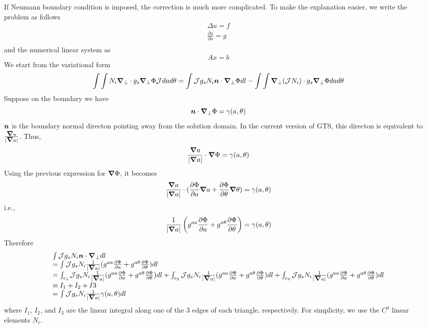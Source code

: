 \documentclass{report}
\newcommand{\bm}[1]{\mbox{\boldmath $#1$}}
\newcommand{\ff}[2]{\frac{#1}{#2}}
\newcommand{\pp}[2]{\frac{\partial{#1}}{\partial{#2}}}
\begin{document}
\noindent
If Neumann boundary condition is imposed, the correction is much more complicated.
To make the explanation easier, we write the problem as follows
$$
\begin{array}{l}
\Delta u = f \\
\pp{u}{n} = g \\
\end{array}
$$
and the numerical linear system as
$$A x = b $$
We start from the variational form 
$$
\int\int N_i \bm{\nabla}_\perp \cdot g_s \bm{\nabla}_\perp \Phi {\cal J} dad\theta
=
\int {\cal J} g_s N_i \bm{n} \cdot \bm{\nabla}_\perp \Phi dl
- \int\int \bm{\nabla}_\perp({\cal J} N_i) \cdot g_s \bm{\nabla}_\perp \Phi dad\theta
$$
Suppose on the boundary we have
$$
\bm{n} \cdot \bm{\nabla}_\perp \Phi = \gamma(a,\theta)
$$
$ \bm{n} $ is the boundary normal directon pointing away from the solution domain.
In the current version of GTS, this directon is equivalent to $\ff{\bm{\nabla}a}{|\bm{\nabla}a|}$.
Thus,
$$
\ff{\bm{\nabla}a}{|\bm{\nabla}a|} \cdot \bm{\nabla} \Phi = \gamma(a,\theta)
$$
Using the previous expression for $\bm{\nabla} \Phi$, it becomes
$$
\ff{\bm{\nabla}a}{|\bm{\nabla}a|} \cdot 
(\pp{\Phi}{a} \bm{\nabla}a + \pp{\Phi}{\theta} \bm{\nabla}\theta) 
= \gamma(a,\theta)
$$
i.e.,
$$
\ff{1}{|\bm{\nabla}a|} \left( g^{aa} \pp{\Phi}{a} + g^{a\theta}\pp{\Phi}{\theta} \right) = \gamma(a,\theta)
$$
Therefore
$$
\begin{array}{l}
\int {\cal J} g_s N_i \bm{n} \cdot \bm{\nabla}_\perp dl \\
= \int {\cal J} g_sN_i \ff{1}{|\bm{\nabla}a|} ( g^{aa} \pp{\Phi}{a} + g^{a\theta}\pp{\Phi}{\theta} ) dl \\
= \int_{e_1} {\cal J} g_s N_i \ff{1}{|\bm{\nabla}a|} ( g^{aa} \pp{\Phi}{a} + g^{a\theta}\pp{\Phi}{\theta} ) dl
  +
  \int_{e_2} {\cal J} g_s N_i \ff{1}{|\bm{\nabla}a|} ( g^{aa} \pp{\Phi}{a} + g^{a\theta}\pp{\Phi}{\theta} ) dl
  +
  \int_{e_3} {\cal J} g_s N_i \ff{1}{|\bm{\nabla}a|} ( g^{aa} \pp{\Phi}{a} + g^{a\theta}\pp{\Phi}{\theta} ) dl
\\
 \equiv I_1 + I_2 + I3 \\
= \int {\cal J} g_s N_i \ff{1}{|\bm{\nabla}a|} \gamma(a,\theta) dl
\end{array}
$$
where $I_1$, $I_2$, and $I_3$ are the linear integral along one of the 3 edges of each triangle,
respectively.
For simplicity, we use the $C^0$ linear elements $N_i$.
\end{document}
